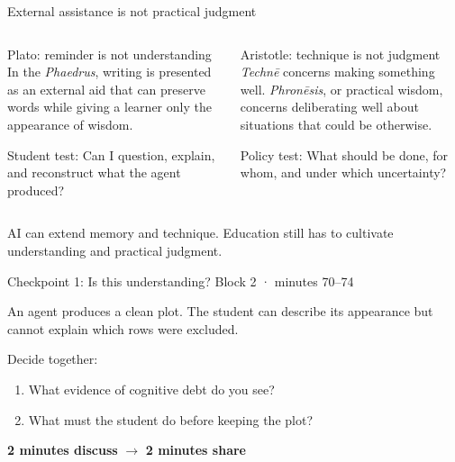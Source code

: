 \begin{frame}{External assistance is not practical judgment}
  \begin{columns}[T,onlytextwidth]
      \begin{block}{Plato: reminder is not understanding}
        In the \emph{Phaedrus}, writing is presented as an external aid that can
        preserve words while giving a learner only the appearance of wisdom.

        \vspace{0.45em}
        \alert{Student test:} Can I question, explain, and reconstruct what the
        agent produced?
      \end{block}
      \begin{block}{Aristotle: technique is not judgment}
        \emph{Techn\={e}} concerns making something well. \emph{Phron\={e}sis},
        or practical wisdom, concerns deliberating well about situations that
        could be otherwise.

        \vspace{0.45em}
        \alert{Policy test:} What should be done, for whom, and under which
        uncertainty?
      \end{block}
  \end{columns}

  \vfill
  AI can extend memory and technique. Education still has to cultivate
  understanding and practical judgment.

\end{frame}

\begin{frame}{Checkpoint 1: Is this understanding?}
  \alert{Block 2 · minutes 70--74}

  \vspace{0.55em}
  An agent produces a clean plot. The student can describe its appearance but
  cannot explain which rows were excluded.

  \vspace{0.55em}
  Decide together:
  \begin{enumerate}
    \item What evidence of cognitive debt do you see?
    \item What must the student do before keeping the plot?
  \end{enumerate}

  \vfill
  \begin{center}
    \textbf{2 minutes discuss} \hspace{2.0em} $\longrightarrow$ \hspace{2.0em}
    \textbf{2 minutes share}
  \end{center}
\end{frame}

